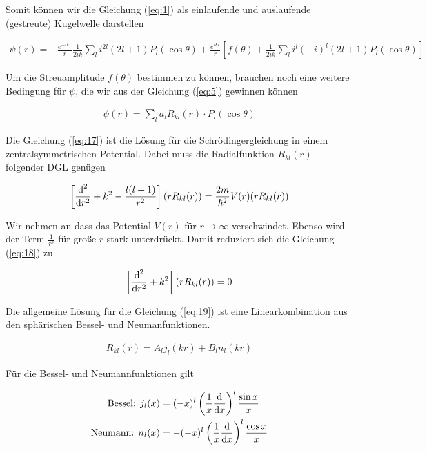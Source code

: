 Somit können wir die Gleichung (\ref{eq:1}) als einlaufende und auslaufende (gestreute) Kugelwelle darstellen

\begin{align}
  \label{eq:16}
  \boxed{ \psi(r) =  - \frac{e^{-ikr}}{r} \frac{1}{2ik} \sum_{l}i^{2l}(2l+1) P_l(\cos\theta) +  \frac{e^{i k r}}{r}\left[f(\theta) +  \frac{1}{2ik} \sum_{l}i^l(-i)^l(2l+1) P_l(\cos\theta)\right] }
\end{align}

Um die Streuamplitude \(f(\theta)\) bestimmen zu können, brauchen noch eine weitere Bedingung für \(\psi\), die wir aus der Gleichung (\ref{eq:5}) gewinnen können

\begin{align}
  \label{eq:17}
   \psi(r) = \sum_l a_{l} R_{kl}(r)\cdot P_{l}(\cos\theta)
\end{align}

Die Gleichung (\ref{eq:17}) ist die Lösung für die Schrödingergleichung in einem zentralsymmetrischen Potential. Dabei muss die Radialfunktion \( R_{kl}(r)\) folgender DGL genügen

\begin{align}
  \label{eq:18}
  \left[ \diff^2_r + k^2 - \frac{l(l+1)}{r^2} \right](rR_{kl}(r)) = \frac{2m}{\hbar^2} V(r)(rR_{kl}(r))
\end{align}

Wir nehmen an dass das Potential \(V(r)\) für \(r\to\infty\) verschwindet. Ebenso wird der Term \(\frac{1}{r^2}\) für große \(r\) stark unterdrückt. Damit reduziert sich die Gleichung (\ref{eq:18}) zu

\begin{align}
  \label{eq:19}
   \left[ \diff^2_r + k^2 \right](rR_{kl}(r)) = 0
\end{align}

Die allgemeine Lösung für die Gleichung (\ref{eq:19}) ist eine Linearkombination aus den sphärischen Bessel- und Neumanfunktionen.

\begin{align}
  \label{eq:20}
  R_{kl}(r) = A_l j_l(kr) + B_l n_l(kr) 
\end{align}

Für die Bessel- und Neumannfunktionen gilt

\begin{align}
    \text{Bessel: } j_l(x) &= (-x)^l\left(\frac{1}{x} \diff_x \right)^l \frac{\sin x}{x} \label{eq:21}\\
  \text{Neumann: } n_l(x) &= - (-x)^l\left(\frac{1}{x} \diff_x \right)^l \frac{\cos x}{x} \label{eq:22}
\end{align}

